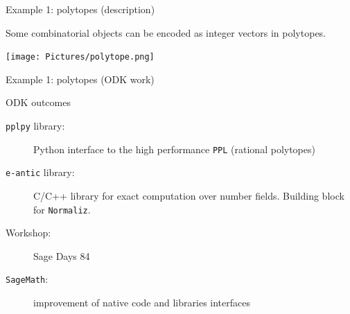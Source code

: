 \documentclass{beamer}
\begin{document}
\begin{frame}{Example 1: polytopes (description)}
  \begin{example}
  Some combinatorial objects can be encoded as integer vectors in polytopes.
  \begin{center}\texttt{[image: Pictures/polytope.png]}\end{center}
  \end{example}

\end{frame}
\begin{frame}{Example 1: polytopes (ODK work)}
  \begin{block}{ODK outcomes}
  \begin{description}
  \item[\texttt{pplpy} library:] Python interface to the high performance
  \texttt{PPL} (rational polytopes)
  \hfill{}
  \item[\texttt{e-antic} library:] C/C++ library for exact computation over
  number fields. Building block for \texttt{Normaliz}.
  \hfill{}
  \item[Workshop:] Sage Days 84
  \item[\texttt{SageMath}:] improvement of native code and libraries
  interfaces \hfill{}
  \end{description}
  \end{block}

\end{frame}
\end{document}
